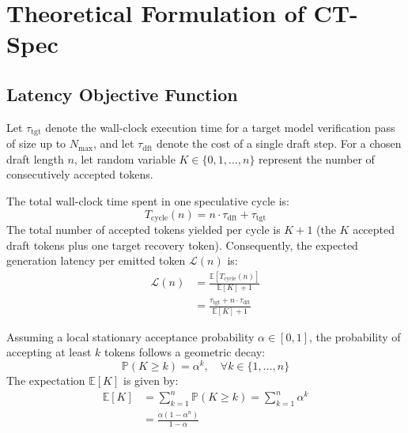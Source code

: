 \documentclass[journal,10pt,twocolumn]{IEEEtran}
\newcommand{\ttg}{\mathrm{tgt}}
\newcommand{\dft}{\mathrm{dft}}
\newcommand{\ctspec}{\mbox{CT-Spec}}
\begin{document}
\section{Theoretical Formulation of \ctspec{}}

\subsection{Latency Objective Function}
Let $\tau_{\ttg}$ denote the wall-clock execution time for a target model verification pass of size up to $N_{\max}$, and let $\tau_{\dft}$ denote the cost of a single draft step. For a chosen draft length $n$, let random variable $K \in \{0, 1, \dots, n\}$ represent the number of consecutively accepted tokens.

The total wall-clock time spent in one speculative cycle is:
\begin{equation}
T_{\mathrm{cycle}}(n) = n \cdot \tau_{\dft} + \tau_{\ttg}
\end{equation}
The total number of accepted tokens yielded per cycle is $K + 1$ (the $K$ accepted draft tokens plus one target recovery token). Consequently, the expected generation latency per emitted token $\mathcal{L}(n)$ is:
\begin{equation}
\begin{split}
\mathcal{L}(n) &= \frac{\mathbb{E}[T_{\mathrm{cycle}}(n)]}{\mathbb{E}[K] + 1} \\
&= \frac{\tau_{\ttg} + n \cdot \tau_{\dft}}{\mathbb{E}[K] + 1}
\end{split}
\label{eq:latency_obj}
\end{equation}

Assuming a local stationary acceptance probability $\alpha \in [0, 1]$, the probability of accepting at least $k$ tokens follows a geometric decay:
\begin{equation}
\mathbb{P}(K \ge k) = \alpha^k, \quad \forall k \in \{1, \dots, n\}
\end{equation}
The expectation $\mathbb{E}[K]$ is given by:
\begin{equation}
\begin{split}
\mathbb{E}[K] &= \sum_{k=1}^n \mathbb{P}(K \ge k) = \sum_{k=1}^n \alpha^k \\
&= \frac{\alpha (1 - \alpha^n)}{1 - \alpha}
\end{split}
\label{eq:expected_k}
\end{equation}
\end{document}
